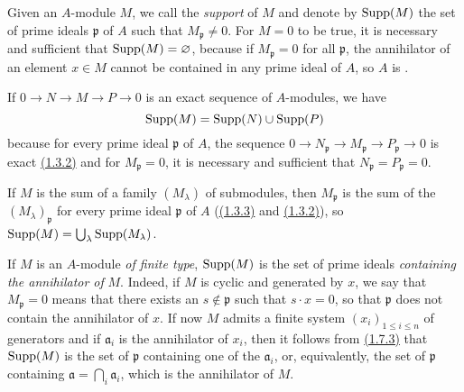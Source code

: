 \begin{env}[1.7.1]
\label{env-0.1.7.1}
Given an $A$-module $M$, we call the {\em support} of $M$ and denote by
${\mathop{\mathrm{Supp}}\nolimits}(M)$ the set of prime ideals $\mathfrak{p}$ of $A$ such that
$M_\mathfrak{p}\neq 0$. For $M=0$ to be true, it is necessary and sufficient
that ${\mathop{\mathrm{Supp}}\nolimits}(M)=\varnothing$, because if $M_\mathfrak{p}=0$ for all $\mathfrak{p}$, the
annihilator of an element $x\in M$ cannot be contained in any prime ideal of
$A$, so $A$ is .
\end{env}

\begin{env}[1.7.2]
\label{env-0.1.7.2}
If $0\to N\to M\to P\to 0$ is an exact sequence of $A$-modules, we have
\[
  {\mathop{\mathrm{Supp}}\nolimits}(M)={\mathop{\mathrm{Supp}}\nolimits}(N)\cup{\mathop{\mathrm{Supp}}\nolimits}(P)
\]
because for every prime ideal $\mathfrak{p}$ of $A$, the sequence
$0\to N_\mathfrak{p}\to M_\mathfrak{p}\to P_\mathfrak{p}\to 0$ is exact
\hyperref[env-0.1.3.2]{(1.3.2)} and for $M_\mathfrak{p}=0$, it is necessary and sufficient
that $N_\mathfrak{p}=P_\mathfrak{p}=0$.
\end{env}

\begin{env}[1.7.3]
\label{env-0.1.7.3}
If $M$ is the sum of a family $(M_\lambda)$ of submodules, then $M_\mathfrak{p}$
is the sum of the $(M_\lambda)_\mathfrak{p}$ for every prime ideal
$\mathfrak{p}$ of $A$ (\hyperref[env-0.1.3.3]{(1.3.3)} and \hyperref[env-0.1.3.2]{(1.3.2)}),
so ${\mathop{\mathrm{Supp}}\nolimits}(M)=\bigcup_\lambda{\mathop{\mathrm{Supp}}\nolimits}(M_\lambda)$.
\end{env}

\begin{env}[1.7.4]
\label{env-0.1.7.4}
If $M$ is an $A$-module {\em of finite type}, ${\mathop{\mathrm{Supp}}\nolimits}(M)$ is the set of prime
ideals {\em containing the annihilator of} $M$. Indeed, if $M$ is cyclic and
generated by $x$, we say that $M_\mathfrak{p}=0$ means that there exists an
$s\not\in\mathfrak{p}$ such that $s\cdot x=0$, so that $\mathfrak{p}$ does not
contain the annihilator of $x$. If now $M$ admits a finite system
$(x_i)_{1\leqslant i\leqslant n}$ of generators and if $\mathfrak{a}_i$ is the
annihilator of $x_i$, then it follows from \hyperref[env-0.1.7.3]{(1.7.3)} that ${\mathop{\mathrm{Supp}}\nolimits}(M)$ is
the set of $\mathfrak{p}$ containing one of the $\mathfrak{a}_i$, or,
equivalently, the set of $\mathfrak{p}$ containing
$\mathfrak{a}=\bigcap_i\mathfrak{a}_i$, which is the annihilator of $M$.
\end{env}


